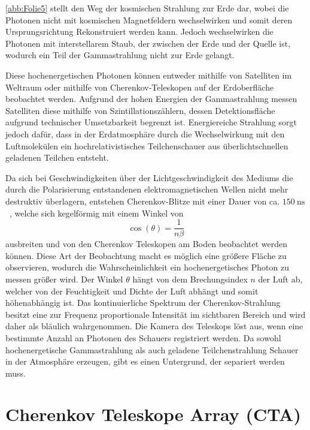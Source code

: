 \autoref{abb:Folie5} stellt den Weg der kosmischen Strahlung zur Erde dar, wobei die Photonen nicht mit kosmischen Magnetfeldern wechselwirken
und somit deren Ursprungsrichtung Rekonstruiert werden kann. Jedoch wechselwirken die Photonen mit interstellarem Staub, der zwischen der Erde und der
Quelle ist, wodurch ein Teil der Gammastrahlung nicht zur Erde gelangt.

Diese hochenergetischen Photonen können entweder mithilfe von Satelliten im Weltraum oder mithilfe von Cherenkov-Teleskopen auf
der Erdoberfläche beobachtet werden.
Aufgrund der hohen Energien der Gammastrahlung messen Satelliten diese mithilfe von Szintillationszählern, dessen Detektionsfläche
aufgrund technischer Umsetzbarkeit begrenzt ist.
Energiereiche Strahlung sorgt jedoch dafür, dass in der Erdatmosphäre durch die Wechselwirkung mit den Luftmolekülen ein hochrelativistisches
Teilchenschauer aus überlichtschnellen geladenen Teilchen entsteht.

Da sich bei Geschwindigkeiten über der Lichtgeschwindigkeit des Mediums die durch die Polarisierung entstandenen elektromagnetischen Wellen
nicht mehr destruktiv überlagern, entstehen Cherenkov-Blitze mit einer Dauer von ca. $\SI{150}{\nano\s}$~\cite{Cherenkov_Licht}, welche sich kegelförmig
mit einem Winkel von
\begin{equation}
 \cos(\theta) = \frac{1}{n\beta}
\end{equation}
ausbreiten und von den Cherenkov
Teleskopen am Boden beobachtet werden können.
Diese Art der Beobachtung macht es möglich eine größere Fläche zu observieren, wodurch die Wahrscheinlichkeit ein hochenergetisches
Photon zu messen größer wird.
Der Winkel $\theta$ hängt von dem Brechungsindex $n$ der Luft ab, welcher von der Feuchtigkeit und Dichte der Luft abhängt und somit höhenabhängig ist.
Das kontinuierliche Spektrum der Cherenkov-Strahlung besitzt eine zur Frequenz proportionale Intensität im sichtbaren Bereich und
wird daher als bläulich wahrgenommen.
Die Kamera des Teleskops löst aus, wenn eine bestimmte Anzahl an Photonen des Schauers registriert werden.
Da sowohl hochenergetische Gammastrahlung als auch geladene Teilchenstrahlung
Schauer in der Atmosphäre erzeugen, gibt es einen Untergrund, der separiert werden muss.

\section{Cherenkov Teleskope Array (CTA)}
\label{sec:CTA}

